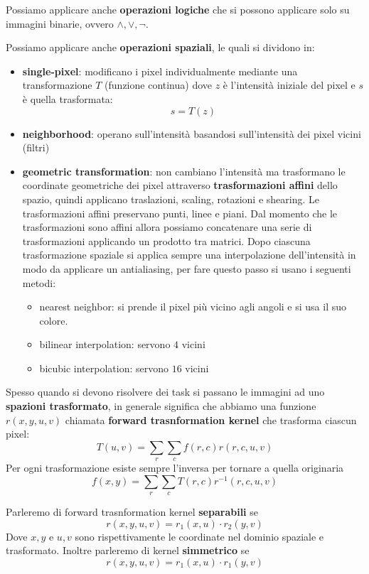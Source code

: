Possiamo applicare anche \textbf{operazioni logiche} che si possono applicare solo 
su immagini binarie, ovvero $\land, \lor, \lnot$.

Possiamo applicare anche \textbf{operazioni spaziali}, le quali si dividono in:
\begin{itemize}
    \item \textbf{single-pixel}: modificano i pixel individualmente mediante una 
    transformazione $T$ (funzione continua) dove $z$ è l'intensità iniziale del pixel e $s$ è quella
    trasformata:
    $$s=T(z)$$
    \item \textbf{neighborhood}: operano sull'intensità basandosi sull'intensità 
    dei pixel vicini (filtri)
    \item \textbf{geometric transformation}: non cambiano l'intensità ma trasformano 
    le coordinate geometriche dei pixel attraverso \textbf{trasformazioni affini} dello spazio, quindi applicano traslazioni, scaling,
    rotazioni e shearing. Le trasformazioni affini preservano punti, linee e piani.
    Dal momento che le trasformazioni sono affini allora possiamo concatenare 
    una serie di trasformazioni applicando un prodotto tra matrici.
    Dopo ciascuna trasformazione spaziale si applica sempre una interpolazione 
    dell'intensità in modo da applicare un antialiasing, per fare questo passo si
    usano i seguenti metodi:
    \begin{itemize}
        \item nearest neighbor: si prende il pixel più vicino agli angoli e si usa 
        il suo colore.
        \item bilinear interpolation: servono $4$ vicini
        \item bicubic interpolation: servono $16$ vicini 
    \end{itemize}
\end{itemize}

Spesso quando si devono risolvere dei task si passano le immagini ad uno \textbf{spazioni 
trasformato}, in generale significa che abbiamo una funzione $r(x,y,u,v)$ chiamata 
\textbf{forward trasnformation kernel} che trasforma ciascun pixel:
$$T(u,v) = \sum_r \sum_c f(r,c) r(r,c,u,v)$$
Per ogni trasformazione esiste sempre l'inversa per tornare a quella originaria
$$f(x,y) = \sum_r \sum_c T(r,c) r^{-1}(r,c,u,v)$$

Parleremo di forward trasnformation kernel \textbf{separabili} se 
$$r(x,y,u,v) = r_1(x,u) \cdot r_2(y,v)$$
Dove $x,y$ e $u,v$ sono rispettivamente le coordinate nel dominio spaziale e trasformato.
Inoltre parleremo di kernel \textbf{simmetrico} se 
$$r(x,y,u,v) = r_1(x,u) \cdot r_1(y,v)$$

